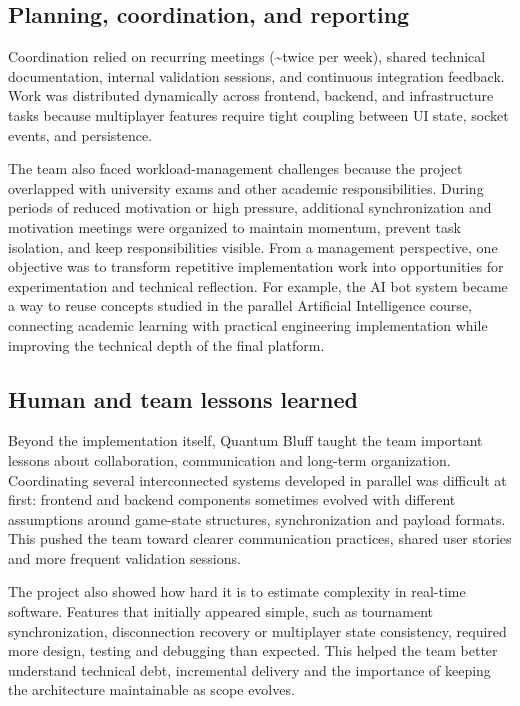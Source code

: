 \documentclass[11pt,a4paper]{article}
\begin{document}
\subsection{Planning, coordination, and reporting}

Coordination relied on recurring meetings (\textasciitilde{}twice per week), shared technical documentation, internal validation sessions, and continuous integration feedback. Work was distributed dynamically across frontend, backend, and infrastructure tasks because multiplayer features require tight coupling between UI state, socket events, and persistence.

The team also faced workload-management challenges because the project overlapped with university exams and other academic responsibilities. During periods of reduced motivation or high pressure, additional synchronization and motivation meetings were organized to maintain momentum, prevent task isolation, and keep responsibilities visible. From a management perspective, one objective was to transform repetitive implementation work into opportunities for experimentation and technical reflection. For example, the AI bot system became a way to reuse concepts studied in the parallel Artificial Intelligence course, connecting academic learning with practical engineering implementation while improving the technical depth of the final platform.

\subsection{Human and team lessons learned}

Beyond the implementation itself, Quantum Bluff taught the team important lessons about collaboration, communication and long-term organization. Coordinating several interconnected systems developed in parallel was difficult at first: frontend and backend components sometimes evolved with different assumptions around game-state structures, synchronization and payload formats. This pushed the team toward clearer communication practices, shared user stories and more frequent validation sessions.

The project also showed how hard it is to estimate complexity in real-time software. Features that initially appeared simple, such as tournament synchronization, disconnection recovery or multiplayer state consistency, required more design, testing and debugging than expected. This helped the team better understand technical debt, incremental delivery and the importance of keeping the architecture maintainable as scope evolves.
\end{document}
